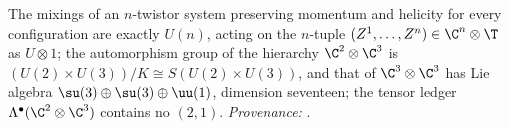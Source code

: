 The mixings of an $n$-twistor system preserving momentum and helicity for every configuration are exactly $U(n)$, acting on the $n$-tuple $(Z^{1}, \ldots, Z^{n}) \in \C^{n} \otimes \T$ as $U \otimes 1$; the automorphism group of the hierarchy $\C^{2} \otimes \C^{3}$ is $(U(2) \times U(3))/K \cong S(U(2) \times U(3))$, and that of $\C^{3} \otimes \C^{3}$ has Lie algebra $\su(3) \oplus \su(3) \oplus \uu(1)$, dimension seventeen; the tensor ledger $\Lambda^{\bullet}(\C^{2} \otimes \C^{3})$ contains no $(2,1)$. \emph{Provenance:} \cite[Prop.~3.1, Thms.~4.1, 4.2, Prop.~5.3(2)]{ButlerT12}.
